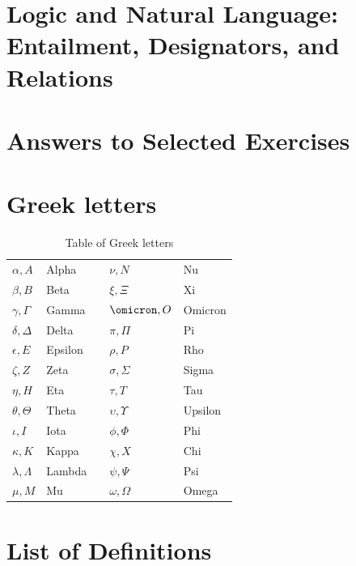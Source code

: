 \documentclass[openany,leqno,10pt]{book}
\theoremstyle{break}
\theoremstyle{definition}
\theoremstyle{remark}
\begin{document}
\chapter[Entailment, Designators, and Relations]{Logic and Natural Language: Entailment, Designators, and Relations}\label{c:edr} %



\appendix


\chapter[Answers to Selected Exercises]{Answers to Selected Exercises}\label{exans}



\chapter{Greek letters}\label{greek}

\begin{table}[h] \begin{center}
	\begin{tabular}{llcll}
		\toprule
		$\alpha, A$ & Alpha && $\nu, N$ & Nu\\
		$\beta, B$ & Beta && $\xi, \Xi$ & Xi\\
		$\gamma, \Gamma$ & Gamma && $\omicron, O$ & Omicron\\
		$\delta, \Delta$ & Delta && $\pi, \Pi$ & Pi\\
		$\epsilon, E$ & Epsilon && $\rho, P$& Rho\\
		$\zeta, Z$ & Zeta && $\sigma, \Sigma$ & Sigma\\
		$\eta, H$ & Eta && $\tau, T$ & Tau\\
		$\theta, \Theta$ & Theta && $\upsilon, \Upsilon$ & Upsilon\\
		$\iota, I$ & Iota && $\phi, \Phi$ & Phi\\
		$\kappa, K$ & Kappa && $\chi, X$ & Chi\\
		$\lambda, \Lambda$ & Lambda && $\psi, \Psi$ & Psi\\
		$\mu, M$ & Mu && $\omega, \Omega$ & Omega \\ 
    \bottomrule
	\end{tabular}
\end{center} \caption{Table of Greek letters}
\end{table}

\twocolumn
\chapter*{List of Definitions}\label{defns}
{\small  {}}
\end{document}
